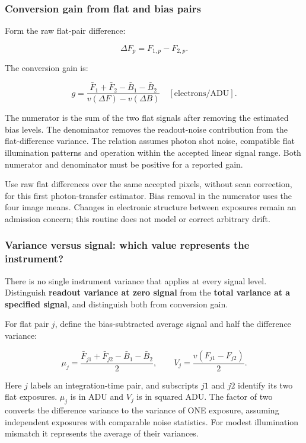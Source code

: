 \documentclass[
  10pt,
  a4paper,
]{article}
\begin{document}
\hypertarget{conversion-gain-from-flat-and-bias-pairs}{%
\subsubsection{Conversion gain from flat and bias
pairs}\label{conversion-gain-from-flat-and-bias-pairs}}

Form the raw flat-pair difference:

\[
\Delta F_p=F_{1,p}-F_{2,p}.
\]

The conversion gain is:

\[
\boxed{
g =
\frac{\bar F_1+\bar F_2-\bar B_1-\bar B_2}
     {v(\Delta F)-v(\Delta B)}
}
\quad [\mathrm{electrons}/\mathrm{ADU}] .
\]

The numerator is the sum of the two flat signals after removing the
estimated bias levels. The denominator removes the readout-noise
contribution from the flat-difference variance. The relation assumes
photon shot noise, compatible flat illumination patterns and operation
within the accepted linear signal range. Both numerator and denominator
must be positive for a reported gain.

Use raw flat differences over the same accepted pixels, without scan
correction, for this first photon-transfer estimator. Bias removal in
the numerator uses the four image means. Changes in electronic structure
between exposures remain an admission concern; this routine does not
model or correct arbitrary drift.

\hypertarget{variance-versus-signal-which-value-represents-the-instrument}{%
\subsubsection{Variance versus signal: which value represents the
instrument?}\label{variance-versus-signal-which-value-represents-the-instrument}}

There is no single instrument variance that applies at every signal
level. Distinguish \textbf{readout variance at zero signal} from the
\textbf{total variance at a specified signal}, and distinguish both from
conversion gain.

For flat pair \(j\), define the bias-subtracted average signal and half
the difference variance:

\[
\mu_j =
\frac{\bar F_{j1}+\bar F_{j2}-\bar B_1-\bar B_2}{2},
\qquad
V_j=\frac{v(F_{j1}-F_{j2})}{2}.
\]

Here \(j\) labels an integration-time pair, and subscripts \(j1\) and
\(j2\) identify its two flat exposures. \(\mu_j\) is in ADU and \(V_j\)
is in squared ADU. The factor of two converts the difference variance to
the variance of ONE exposure, assuming independent exposures with
comparable noise statistics. For modest illumination mismatch it
represents the average of their variances.
\end{document}
